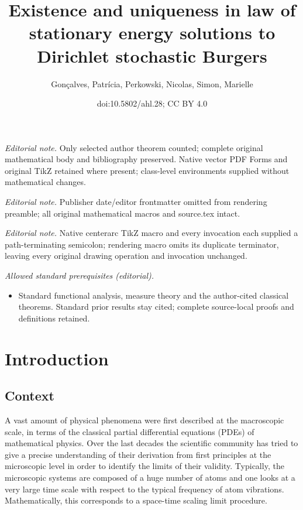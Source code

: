 \documentclass[10pt]{amsart}
\title{Existence and uniqueness in law of stationary energy solutions to Dirichlet stochastic Burgers}
\author{Gonçalves, Patrícia, Perkowski, Nicolas, Simon, Marielle}
\date{doi:10.5802/ahl.28; CC BY 4.0}
\theoremstyle{definition}\newtheorem{defi}[theo]{Definition}\newtheorem{rema}[theo]{Remark}\newtheorem{exam}[theo]{Example}\newtheorem{exem}[theo]{Example}\newtheorem{nota}[theo]{Notation}
\begin{document}
\maketitle
\noindent\textit{Editorial note.} Only selected author theorem counted; complete original mathematical body and bibliography preserved. Native vector PDF Forms and original TikZ retained where present; class-level environments supplied without mathematical changes.\par\medskip
\noindent\textit{Editorial note.} Publisher date/editor frontmatter omitted from rendering preamble; all original mathematical macros and source.tex intact.\par\medskip
\noindent\textit{Editorial note.} Native centerarc TikZ macro and every invocation each supplied a path-terminating semicolon; rendering macro omits its duplicate terminator, leaving every original drawing operation and invocation unchanged.\par\medskip
\noindent\textit{Allowed standard prerequisites (editorial).}\begin{itemize}
\item Standard functional analysis, measure theory and the author-cited classical theorems. Standard prior results stay cited; complete source-local proofs and definitions retained.
\end{itemize}\medskip

\section{Introduction}\label{s1}

\subsection{Context} A vast amount of physical phenomena were first described at the macroscopic scale, in terms of the classical partial differential equations (PDEs) of mathematical physics. Over the last decades the scientific community has tried to give a precise understanding of their derivation from first principles at the microscopic level in order to identify the limits of their validity. Typically, the microscopic systems are composed of a huge number of atoms and one looks at a very large time scale with respect to the typical frequency of atom vibrations. Mathematically, this corresponds to a space-time scaling limit procedure.
\end{document}
